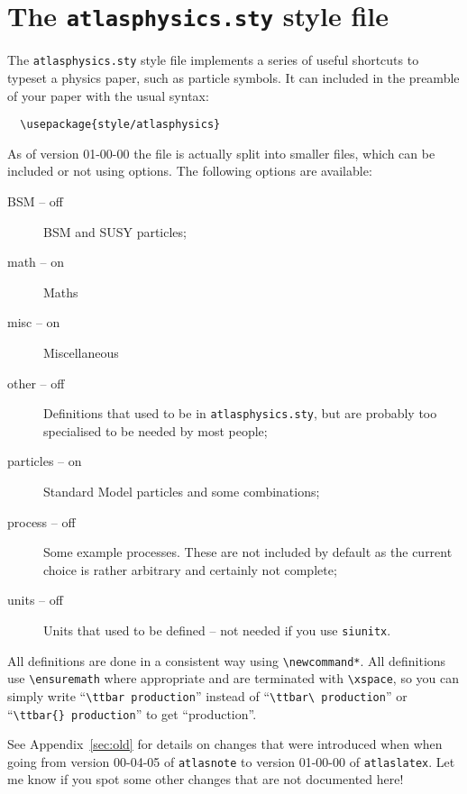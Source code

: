 \documentclass{style/atlasdoc}
\author{Ian C. Brock}
\begin{document}
\tableofcontents

\section{The \texttt{atlasphysics.sty} style file}
\label{app:AtlasPhysicsSty}

The \texttt{atlasphysics.sty} style file implements a series of useful
shortcuts to typeset a physics paper, such as particle
symbols. It can included in the preamble of your paper with the usual
syntax:
%
\begin{verbatim}
  \usepackage{style/atlasphysics}
\end{verbatim}
%
As of version 01-00-00 the file is actually split into smaller files,
which can be included or not using options.
The following options are available:
\begin{description}
\item[BSM -- off] BSM and SUSY particles;
\item[math -- on] Maths
\item[misc -- on] Miscellaneous
\item[other -- off] Definitions that used to be in \texttt{atlasphysics.sty}, 
	but are probably too specialised to be needed by most people;
\item[particles -- on] Standard Model particles and some combinations;
\item[process -- off] Some example processes. 
	These are not included by default as the current choice is rather arbitrary
	and certainly not complete;
\item[units -- off] Units that used to be defined -- not needed if you use \texttt{siunitx}.
\end{description}

All definitions are done in a consistent way using \verb|\newcommand*|.
All definitions use \verb|\ensuremath| where appropriate and are terminated with
\verb|\xspace|, so you can simply write ``\verb|\ttbar production|'' instead of
``\verb|\ttbar\ production|'' or ``\verb|\ttbar{} production|'' to get ``\ttbar production''.

See Appendix~\ref{sec:old} for details on changes that were introduced when
when going from version 00-04-05 of \texttt{atlasnote}
to version 01-00-00 of \texttt{atlaslatex}.
Let me know if you spot some other changes that are not documented here!
\end{document}
